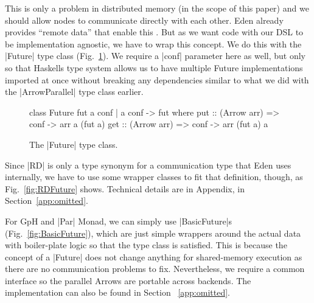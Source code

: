 This is only a problem in distributed memory (in the scope of this paper) and we should allow nodes to communicate directly with each other. Eden already provides \enquote{remote data} that enable this \cite{AlGo03a,Dieterle2010}.
But as we want code with our DSL to be implementation agnostic, we have to wrap this concept. We do this with the |Future| type class (Fig.~\ref{fig:future}). We require a |conf| parameter here as well, but only so that Haskells type system allows us to have multiple Future implementations imported at once without breaking any dependencies similar to what we did with the |ArrowParallel| type class earlier.
\begin{figure}[h]
\begin{code}
class Future fut a conf | a conf -> fut where
    put :: (Arrow arr) => conf -> arr a (fut a)
    get :: (Arrow arr) => conf -> arr (fut a) a
\end{code}
\caption{The |Future| type class.}
\label{fig:future}
\end{figure}
Since |RD| is only a type synonym for a communication type that Eden uses internally, we have to use some wrapper classes to fit that definition, though, as Fig.~\ref{fig:RDFuture} shows. %
Technical details are in Appendix, in Section~\ref{app:omitted}.

For GpH and |Par| Monad, we can simply use |BasicFuture|s (Fig.~\ref{fig:BasicFuture}), which are just simple wrappers around the actual data with boiler-plate logic so that the type class is satisfied. This is because the concept of a |Future| does not change anything for shared-memory execution as there are no communication problems to fix. Nevertheless, we require a common interface so the parallel Arrows are portable across backends. The implementation can also be found in Section ~\ref{app:omitted}.

